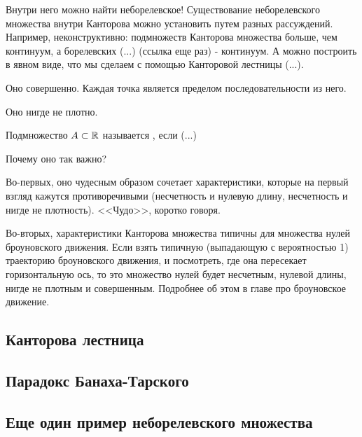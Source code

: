 {Внутри него можно найти неборелевское! Существование неборелевского множества внутри Канторова можно установить путем разных рассуждений. Например, неконструктивно: подмножеств Канторова множества больше, чем континуум, а борелевских (...) (ссылка еще раз) - континуум. А можно построить в явном виде, что мы сделаем с помощью Канторовой лестницы (...).


Оно совершенно. Каждая точка является пределом последовательности из него.

Оно нигде не плотно. 

\begin{mydef} Подмножество $A\subset \mathbb{R}$ называется , если (...)
\end{mydef}



Почему оно так важно?

Во-первых, оно чудесным образом сочетает характеристики, которые на первый взгляд кажутся противоречивыми (несчетность и нулевую длину, несчетность и нигде не плотность). <<Чудо>>, коротко говоря. 

Во-вторых, характеристики Канторова множества типичны для множества нулей броуновского движения. Если взять типичную (выпадающую с вероятностью 1) траекторию броуновского движения, и посмотреть, где она пересекает горизонтальную ось, то это множество нулей будет несчетным, нулевой длины, нигде не плотным и совершенным. Подробнее об этом в главе про броуновское движение.

}\subsection{Канторова лестница} \problemtext{


}\subsection{Парадокс Банаха-Тарского} \problemtext{

}\subsection{Еще один пример неборелевского множества} 

